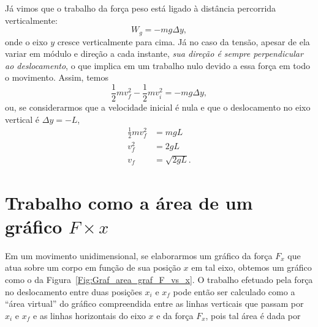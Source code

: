 Já vimos que o trabalho da força peso está ligado à distância percorrida verticalmente:
\begin{equation*}
    W_g = -mg\Delta y,
\end{equation*}
%
onde o eixo $y$ cresce verticalmente para cima. Já no caso da tensão, apesar de ela variar em módulo e direção a cada instante, \emph{sua direção é sempre perpendicular ao deslocamento}, o que implica em um trabalho nulo devido a essa força em todo o movimento. Assim, temos
\begin{equation}
    \frac{1}{2}m v_f^2 - \frac{1}{2}m v_i^2 = -mg\Delta y,
\end{equation}
%
ou, se considerarmos que a velocidade inicial é nula e que o deslocamento no eixo vertical é $\Delta y = - L$,
\begin{align}
    \frac{1}{2} m v_f^2 &= mgL \\
    v_f^2 &= 2gL \\
    v_f &= \sqrt{2gL}.
\end{align}

\section{Trabalho como a área de um gráfico $F \times x$}

Em um movimento unidimensional, se elaborarmos um gráfico da força $F_x$ que atua sobre um corpo em função de sua posição $x$ em tal eixo, obtemos um gráfico como o da Figura~\ref{Fig:Graf_area_graf_F_vs_x}. O trabalho efetuado pela força no deslocamento entre duas posições $x_i$ e $x_f$ pode então ser calculado como a ``área virtual'' do gráfico compreendida entre as linhas verticais que passam por $x_i$ e $x_f$ e as linhas horizontais do eixo $x$ e da força $F_x$, pois tal área é dada por

